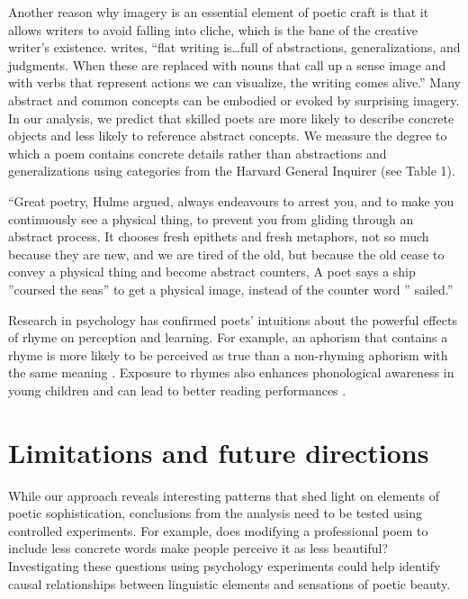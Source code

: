 \documentclass{book}
\begin{document}
Another reason why imagery is an essential element of poetic craft is that it allows writers to avoid falling into cliche, which is the bane of the creative writer's existence. \cite{Burroway} writes, ``flat writing is\dots full of abstractions, generalizations, and judgments. When these are replaced with nouns that call up a sense image and with verbs that represent actions we can visualize, the writing comes alive.'' Many abstract and common concepts can be embodied or evoked by surprising imagery. In our analysis, we predict that skilled poets are more likely to describe concrete objects and less likely to reference abstract concepts. We measure the degree to which a poem contains concrete details rather than abstractions and generalizations using categories from the Harvard General Inquirer (see Table 1). 

``Great poetry, Hulme argued, always endeavours to arrest you, and to make you continuously see a physical thing, to prevent you from gliding through an abstract process. It chooses fresh epithets and fresh metaphors, not so much because they are new, and we are tired of the old, but because the old cease to convey a physical thing and become abstract counters, A poet says a ship ''coursed the seas'' to get a physical image, instead of the counter word '' sailed.'' 

Research in psychology has confirmed poets' intuitions about the powerful effects of rhyme on perception and learning. For example, an aphorism that contains a rhyme is more likely to be perceived as true than a non-rhyming aphorism with the same meaning \citep{aphorisms}. Exposure to rhymes also enhances phonological awareness in young children and can lead to better reading performances \citep{reading}.



\section{Limitations and future directions}

While our approach reveals interesting patterns that shed light on elements of poetic sophistication, conclusions from the analysis need to be tested using controlled experiments. For example, does modifying a professional poem to include less concrete words make people perceive it as less beautiful? Investigating these questions using psychology experiments could help identify causal relationships between linguistic elements and sensations of poetic beauty.
\end{document}

